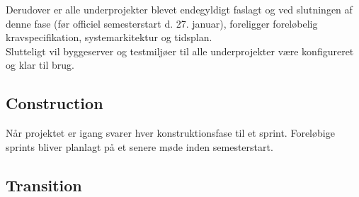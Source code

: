 Derudover er alle underprojekter blevet endegyldigt faslagt og ved slutningen af denne fase (før officiel semesterstart d. 27. januar), foreligger foreløbelig kravspecifikation, systemarkitektur og tidsplan. \\

Slutteligt vil byggeserver og testmiljøer til alle underprojekter være konfigureret og klar til brug.

\subsection{Construction}
Når projektet er igang svarer hver konstruktionsfase til et sprint. Foreløbige sprints bliver planlagt på et senere møde inden semesterstart.

\subsection{Transition}
